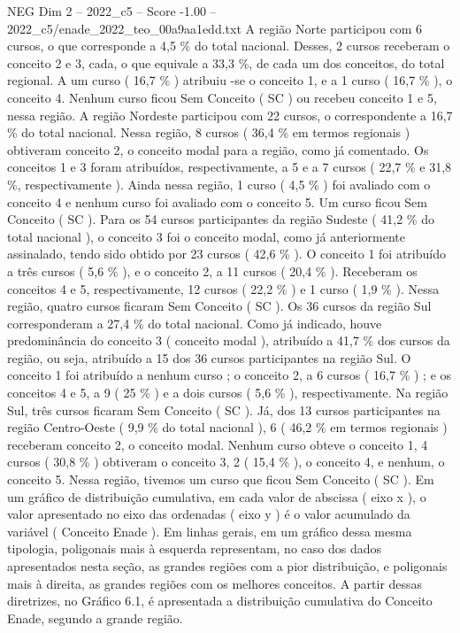 \begin{textsample}{NEG Dim 2 – 2022\_c5 – Score -1.00 – 2022\_c5/enade\_2022\_teo\_00a9aa1edd.txt}
A região Norte participou com 6 cursos, o que corresponde a 4,5 \% do total nacional.
Desses, 2 cursos receberam o conceito 2 e 3, cada, o que equivale a 33,3 \%, de cada um dos conceitos, do total regional.
A um curso ( 16,7 \% ) atribuiu -se o conceito 1, e a 1 curso ( 16,7 \% ), o conceito 4.
Nenhum curso ficou Sem Conceito ( SC ) ou recebeu conceito 1 e 5, nessa região.
A região Nordeste participou com 22 cursos, o correspondente a 16,7 \% do total nacional.
Nessa região, 8 cursos ( 36,4 \% em termos regionais ) obtiveram conceito 2, o conceito modal para a região, como já comentado.
Os conceitos 1 e 3 foram atribuídos, respectivamente, a 5 e a 7 cursos ( 22,7 \% e 31,8 \%, respectivamente ).
Ainda nessa região, 1 curso ( 4,5 \% ) foi avaliado com o conceito 4 e nenhum curso foi avaliado com o conceito 5.
Um curso ficou Sem Conceito ( SC ).
Para os 54 cursos participantes da região Sudeste ( 41,2 \% do total nacional ), o conceito 3 foi o conceito modal, como já anteriormente assinalado, tendo sido obtido por 23 cursos ( 42,6 \% ).
O conceito 1 foi atribuído a três cursos ( 5,6 \% ), e o conceito 2, a 11 cursos ( 20,4 \% ).
Receberam os conceitos 4 e 5, respectivamente, 12 cursos ( 22,2 \% ) e 1 curso ( 1,9 \% ).
Nessa região, quatro cursos ficaram Sem Conceito ( SC ).
Os 36 cursos da região Sul corresponderam a 27,4 \% do total nacional.
Como já indicado, houve predominância do conceito 3 ( conceito modal ), atribuído a 41,7 \% dos cursos da região, ou seja, atribuído a 15 dos 36 cursos participantes na região Sul.
O conceito 1 foi atribuído a nenhum curso ; o conceito 2, a 6 cursos ( 16,7 \% ) ; e os conceitos 4 e 5, a 9 ( 25 \% ) e a dois cursos ( 5,6 \% ), respectivamente.
Na região Sul, três cursos ficaram Sem Conceito ( SC ).
Já, dos 13 cursos participantes na região Centro-Oeste ( 9,9 \% do total nacional ), 6 ( 46,2 \% em termos regionais ) receberam conceito 2, o conceito modal.
Nenhum curso obteve o conceito 1, 4 cursos ( 30,8 \% ) obtiveram o conceito 3, 2 ( 15,4 \% ), o conceito 4, e nenhum, o conceito 5.
Nessa região, tivemos um curso que ficou Sem Conceito ( SC ).
Em um gráfico de distribuição cumulativa, em cada valor de abscissa ( eixo x ), o valor apresentado no eixo das ordenadas ( eixo y ) é o valor acumulado da variável ( Conceito Enade ).
Em linhas gerais, em um gráfico dessa mesma tipologia, poligonais mais à esquerda representam, no caso dos dados apresentados nesta seção, as grandes regiões com a pior distribuição, e poligonais mais à direita, as grandes regiões com os melhores conceitos.
A partir dessas diretrizes, no Gráfico 6.1, é apresentada a distribuição cumulativa do Conceito Enade, segundo a grande região.

\end{textsample}

